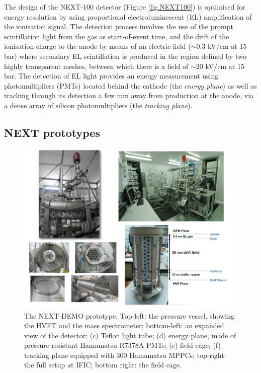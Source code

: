 The design of the NEXT-100 detector (Figure \ref{fig.NEXT100}) is optimised for energy resolution by using proportional electroluminescent (EL) amplification of the ionisation signal. The detection process involves the use of the prompt scintillation light from the gas as start-of-event time, and the drift of the ionisation charge to the anode by means of an electric field ($\sim0.3$ kV/cm at 15 bar) where secondary EL scintillation is produced in the region defined by two highly transparent meshes, between which there is a field of $\sim20$ kV/cm at 15 bar. The detection of EL light provides an energy measurement using photomultipliers (PMTs) located behind the cathode (the \emph{energy plane}) as well as tracking through its detection a few mm away from production at the anode, via a dense array of silicon photomultipliers (the \emph{tracking plane}).

\subsection{NEXT prototypes}

\begin{figure}
\centering
\includegraphics[width=0.99\textwidth]{img/DemoSetup2.jpg}
\caption{\small The NEXT-DEMO prototype. Top-left: the pressure vessel, showing the HVFT and the mass spectrometer; bottom-left: an expanded view of the detector; (c) Teflon light tube; (d) energy plane, made of pressure resistant Hamamatsu R7378A PMTs; (e) field cage; (f) tracking plane equipped with 300 Hamamatsu MPPCs; top-right: the full setup at IFIC; bottom right: the field cage.} \label{fig.DEMO}
\end{figure}

